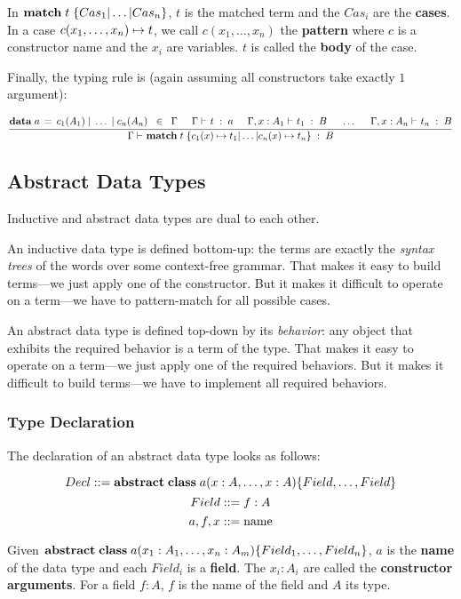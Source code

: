 In $\amatchI{t}{Cas_1,\ldots,Cas_n}$, $t$ is the matched term and the $Cas_i$ are the \textbf{cases}.
In a case $c(x_1,\ldots,x_n) \mapsto t$, we call $c(x_1,\ldots,x_n)$ the \textbf{pattern} where $c$ is a constructor name and the $x_i$ are variables.
$t$ is called the \textbf{body} of the case.

Finally, the typing rule is (again assuming all constructors take exactly $1$ argument): 

\[\rul{\adata{a}{c_1(A_1),\ldots,c_n(A_n)}\;\;\in\;\;\Gamma \tb \oftype{}{\Gamma}{t}{a}\tb\oftype{}{\Gamma,x:A_1}{t_1}{B}\tb\ldots\tb\oftype{}{\Gamma,x:A_n}{t_n}{B}}
      {\oftype{}{\Gamma}{\amatchI{t}{\acase{c_1(x)}{t_1},\ldots,\acase{c_n(x)}{t_n}}}{B}}\]


\subsection{Abstract Data Types}

Inductive and abstract data types are dual to each other.

An inductive data type is defined bottom-up: the terms are exactly the \emph{syntax trees} of the words over some context-free grammar.
That makes it easy to build terms---we just apply one of the constructor.
But it makes it difficult to operate on a term---we have to pattern-match for all possible cases.

An abstract data type is defined top-down by its \emph{behavior}: any object that exhibits the required behavior is a term of the type.
That makes it easy to operate on a term---we just apply one of the required behaviors.
But it makes it difficult to build terms---we have to implement all required behaviors.

\subsubsection{Type Declaration}

The declaration of an abstract data type looks as follows:

\[Decl \bbc \aclassAI{a}{x:A,\ldots,x:A}{}{Field,\ldots,Field}\]
\[Field ::= f:A\]
\[a,f,x ::= \text{name} \]

Given $\aclassAI{a}{x_1:A_1,\ldots,x_n:A_m}{}{Field_1,\ldots,Field_n}$, $a$ is the \textbf{name} of the data type and each $Field_i$ is a \textbf{field}.
The $x_i:A_i$ are called the \textbf{constructor arguments}.
For a field $f:A$, $f$ is the name of the field and $A$ its type.

